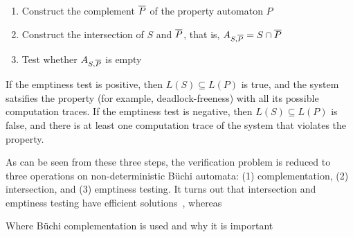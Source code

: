 \begin{enumerate}
\item Construct the complement $\cl1{P}$ of the property automaton $P$
\item Construct the intersection of $S$ and $\cl1{P}$, that is, $A_{S,\cl1{P}} = S \cap \cl1{P}$
\item Test whether $A_{S,\cl1{P}}$ is empty
\end{enumerate}

If the emptiness test is positive, then $L(S) \subseteq L(P)$ is true, and the system satsifies the property (for example, deadlock-freeness) with all its possible computation traces. If the emptiness test is negative, then $L(S) \subseteq L(P)$ is false, and there is at least one computation trace of the system that violates the property.

As can be seen from these three steps, the verification problem is reduced to three operations on non-deterministic Büchi automata: (1) complementation, (2) intersection, and (3) emptiness testing. It turns out that intersection and emptiness testing have efficient solutions~\cite{1996_vardi}, whereas 


Where Büchi complementation is used and why it is important

